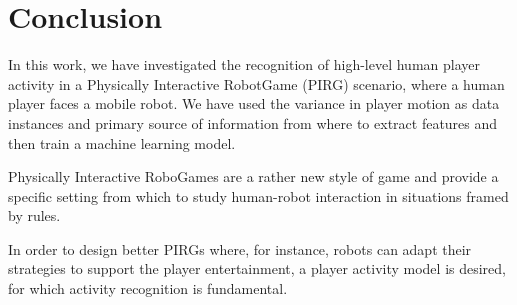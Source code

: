 \section{Conclusion}
In this work, we have investigated the recognition of high-level human player activity in a Physically Interactive RobotGame (PIRG) scenario, where a human player faces a mobile robot. We have used the variance in player motion as data instances and primary source of information from where to extract features and then train a machine learning model. 

Physically Interactive RoboGames are a rather new style of game and provide a specific setting from which to study human-robot interaction in situations framed by rules.

In order to design better PIRGs where, for instance, robots can adapt their strategies to support the player entertainment, a player activity model is desired, for which activity recognition is fundamental. 


